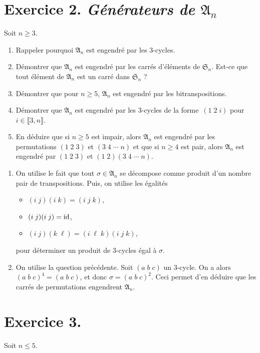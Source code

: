\documentclass[./main]{subfiles}
\begin{document}
  \section{Exercice 2. \textit{Générateurs de $\mathfrak{A}_n$}}
  \begin{enonce}
    Soit $n \ge 3$.
    \begin{enumerate}
      \item Rappeler pourquoi $\mathfrak{A}_n$ est engendré par les $3$-cycles.
      \item Démontrer que $\mathfrak{A}_n$ est engendré par les carrés d'éléments de $\mathfrak{S}_n$.
        Est-ce que tout élément de $\mathfrak{A}_n$ est un carré dans $\mathfrak{S}_n$ ?
      \item Démontrer que pour $n \ge 5$, $\mathfrak{A}_n$ est engendré par les bitranspositions.
      \item Démontrer que $\mathfrak{A}_n$ est engendré par les $3$-cycles de la forme~$(1\;2\;i)$ pour $i \in \llbracket 3,n\rrbracket$.
      \item En déduire que si $n \ge 5$ est impair, alors $\mathfrak{A}_n$ est engendré par les permutations $(1\;2\;3)$ et $(3\;4\;\cdots\; n)$ et que si $n \ge 4$ est pair, alors $\mathfrak{A}_n$ est engendré par $(1\;2\;3)$ et $(1\;2)(3\;4\;\cdots\; n)$.
    \end{enumerate}
  \end{enonce}
  \begin{enumerate}
    \item On utilise le fait que tout $\sigma \in \mathfrak{A}_n$ se décompose comme produit d'un nombre pair de transpositions.
      Puis, on utilise les égalités 
      \begin{itemize}
        \item $(i\;j)(i\;k) = (i\;j\;k)$,
        \item $(i\;j)(i\;j) = \operatorname{id}$,
        \item $(i\;j)(k\;\ell) = (i\;\ell\;k)(i\;j\;k)$,
      \end{itemize}
      pour déterminer un produit de $3$-cycles égal à $\sigma$.
    \item On utilise la question précédente.
      Soit $(a\;b\;c)$ un $3$-cycle.
      On a alors $(a\;b\;c)^4 = (a\;b\;c)$, et donc $\sigma = (a\;b\;c)^2$.
      Ceci permet d'en déduire que les carrés de permutations engendrent $\mathfrak{A}_n$.
  \end{enumerate}

  \section{Exercice 3.}
  \begin{enonce}
    Soit $n \le 5$.
  \end{enonce}
\end{document}
